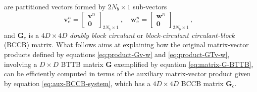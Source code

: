 are partitioned vectors formed by $2N_{b} \times 1$ sub-vectors
\begin{equation}
	\mathbf{v}_{c}^{n} = \begin{bmatrix}
		\mathbf{v}^{n} \\ \mathbf{0}
	\end{bmatrix}_{2N_{b} \times 1} \: , \quad 
	\mathbf{w}_{c}^{n} = \begin{bmatrix}
		\mathbf{w}^{n} \\ \mathbf{0}
	\end{bmatrix}_{2N_{b} \times 1} \: ,
	\label{eq:vectors-vc-wc-ell}
\end{equation}
and $\mathbf{G}_{c}$ is a $4D \times 4D$ \textit{doubly block circulant} \cite[][p. 28]{jain1989} or 
\textit{block-circulant circulant-block} (BCCB) \cite[][p. 76]{chan-jin2007} matrix.
What follows aims at explaining how the original matrix-vector products defined by equations \ref{eq:product-Gv-w}
and \ref{eq:product-GTv-w}, involving a $D \times D$ BTTB matrix $\mathbf{G}$ exemplified by equation \ref{eq:matrix-G-BTTB}, 
can be efficiently computed in terms of the auxiliary matrix-vector product given by equation \ref{eq:aux-BCCB-system}, which
has a $4D \times 4D$ BCCB matrix $\mathbf{G}_{c}$.

